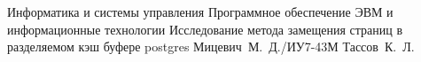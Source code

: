 \documentclass{bmstu}
\begin{document}
\makeresearchtitle
{Информатика и системы управления} %
{Программное обеспечение ЭВМ и информационные технологии} %
{Исследование метода замещения страниц в разделяемом кэш буфере postgres} %
{Мицевич~М.~Д./ИУ7-43М} %
{Тассов~К.~Л.} %
{} %




\maketableofcontents

%
%



%
%
%


\makebibliography

%
\end{document}
